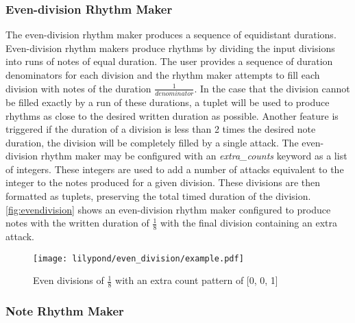 \subsubsection{Even-division Rhythm Maker}

The even-division rhythm maker produces a sequence of equidistant durations. Even-division rhythm makers produce rhythms by dividing the input divisions into runs of notes of equal duration. The user provides a sequence of duration denominators for each division and the rhythm maker attempts to fill each division with notes of the duration $\frac{1}{denominator}$. In the case that the division cannot be filled exactly by a run of these durations, a tuplet will be used to produce rhythms as close to the desired written duration as possible. Another feature is triggered if the duration of a division is less than 2 times the desired note duration, the division will be completely filled by a single attack. The even-division rhythm maker may be configured with an \textit{extra\_counts} keyword as a list of integers. These integers are used to add a number of attacks equivalent to the integer to the notes produced for a given division. These divisions are then formatted as tuplets, preserving the total timed duration of the division. \autoref{fig:evendivision} shows an even-division rhythm maker configured to produce notes with the written duration of $\frac{1}{8}$ with the final division containing an extra attack.


\begin{figure}[H]
    \texttt{[image: lilypond/even\_division/example.pdf]}
    \caption{Even divisions of $\frac{1}{8}$ with an extra count pattern of [0, 0, 1]}
    \label{fig:evendivision}
\end{figure}

\subsubsection{Note Rhythm Maker}

